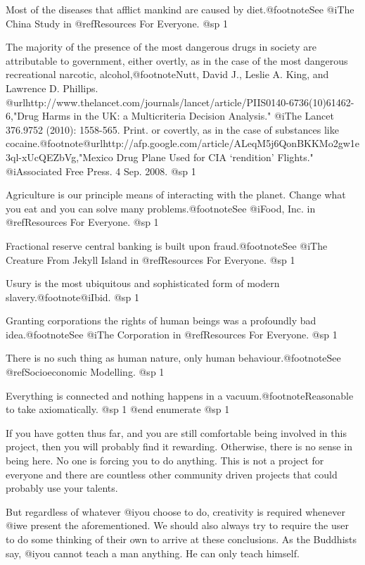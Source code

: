 \item
Most of the diseases that afflict mankind are caused by diet.@footnote{See @i{The China Study} in @ref{Resources For Everyone}.}
@sp 1

\item
The majority of the presence of the most dangerous drugs in society are attributable to government, either overtly, as in the case of the most dangerous recreational narcotic, alcohol,@footnote{Nutt, David J., Leslie A. King, and Lawrence D. Phillips. @url{http://www.thelancet.com/journals/lancet/article/PIIS0140-6736(10)61462-6,"Drug Harms in the UK: a Multicriteria Decision Analysis."} @i{The Lancet} 376.9752 (2010): 1558-565. Print.} or covertly, as in the case of substances like cocaine.@footnote{@url{http://afp.google.com/article/ALeqM5j6QonBKKMo2gw1e3ql-xUcQEZbVg,"Mexico Drug Plane Used for CIA ‘rendition’ Flights."} @i{Associated Free Press}. 4 Sep. 2008.}
@sp 1

\item
Agriculture is our principle means of interacting with the planet. Change what you eat and you can solve many problems.@footnote{See @i{Food, Inc.} in @ref{Resources For Everyone}.}
@sp 1

\item
Fractional reserve central banking is built upon fraud.@footnote{See @i{The Creature From Jekyll Island} in @ref{Resources For Everyone}.}
@sp 1

\item
Usury is the most ubiquitous and sophisticated form of modern slavery.@footnote{@i{Ibid.}}
@sp 1

\item
Granting corporations the rights of human beings was a profoundly bad idea.@footnote{See @i{The Corporation} in @ref{Resources For Everyone}.}
@sp 1

\item
There is no such thing as human nature, only human behaviour.@footnote{See @ref{Socioeconomic Modelling}.}
@sp 1

\item
Everything is connected and nothing happens in a vacuum.@footnote{Reasonable to take axiomatically.}
@sp 1
@end enumerate
@sp 1

If you have gotten thus far, and you are still comfortable being involved in this project, then you will probably find it rewarding. Otherwise, there is no sense in being here. No one is forcing you to do anything. This is not a project for everyone and there are countless other community driven projects that could probably use your talents.

But regardless of whatever @i{you} choose to do, creativity is required whenever @i{we} present the aforementioned. We should also always try to require the user to do some thinking of their own to arrive at these conclusions. As the Buddhists say, @i{you cannot teach a man anything. He can only teach himself}.

